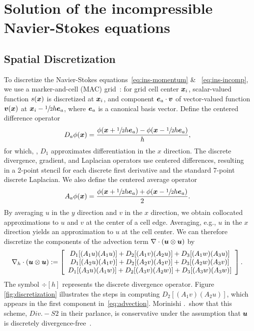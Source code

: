 \section{Solution of the incompressible Navier-Stokes equations}\label{sec:ins}

\subsection{Spatial Discretization}\label{sec:ns_space}

To discretize the Navier-Stokes equations~\eqref{eq:ins-momentum} \&~%
\eqref{eq:ins-incomp}, we use a marker-and-cell (MAC) grid~\cite{Welch:1965jv}: for grid
cell center $\boldsymbol{x}_i$, scalar-valued function $s(\boldsymbol{x})$ is discretized at $\boldsymbol{x}_i$, and
component $\boldsymbol{e}_a\cdot\boldsymbol{v}$ of vector-valued function $\boldsymbol{v}(\boldsymbol{x})$ at
$\boldsymbol{x}_i-\sfrac12h\boldsymbol{e}_a$, where $\boldsymbol{e}_a$ is a canonical basis vector. Define the centered
difference operator
\begin{equation*}
    D_a\phi(\boldsymbol{x}) = \frac{\phi(\boldsymbol{x}+\sfrac12 h\boldsymbol{e}_a) - \phi(\boldsymbol{x}-\sfrac12 h\boldsymbol{e}_a)}{h},
\end{equation*}
for which, , $D_1$ approximates differentiation in the $x$ direction. The
discrete divergence, gradient, and Laplacian operators use centered differences,
resulting in a 2-point stencil for each discrete first derivative and the standard
7-point discrete Laplacian. We also define the centered average operator
\begin{equation*}
    A_a\phi(\boldsymbol{x}) = \frac{\phi(\boldsymbol{x}+\sfrac12 h\boldsymbol{e}_a) + \phi(\boldsymbol{x}-\sfrac12 h\boldsymbol{e}_a)}2.
\end{equation*}
By averaging $u$ in the $y$ direction and $v$ in the $x$ direction, we obtain collocated
approximations to $u$ and $v$ at the center of a cell edge. Averaging, e.g., $u$ in the
$x$ direction yields an approximation to $u$ at the cell center. We can therefore
discretize the components of the advection term $\div(\u\otimes\u)$ by
\begin{equation}\label{eq:advection}
    \div[h](\u\otimes\u) := %
    \left[\begin{array}{c}
        D_1[(A_1 u) (A_1 u)] + D_2[(A_1 v) (A_2 u)] + D_3[(A_1 w) (A_3 u)] \\
        D_1[(A_2 u) (A_1 v)] + D_2[(A_2 v) (A_2 v)] + D_3[(A_2 w) (A_3 v)] \\
        D_1[(A_3 u) (A_1 w)] + D_2[(A_3 v) (A_2 w)] + D_3[(A_3 w) (A_3 w)]
    \end{array}\right].
\end{equation}
The symbol $\div[h]$ represents the discrete divergence operator. Figure~%
\ref{fig:discretization} illustrates the steps in computing $D_2[(A_1 v)(A_2 u)]$, which
appears in the first component in~\eqref{eq:advection}. Morinishi .\ show
that this scheme, $Div. - S2$ in their parlance, is conservative under the assumption
that $\boldsymbol{u}$ is discretely divergence-free~\cite{Morinishi:1998us}.

